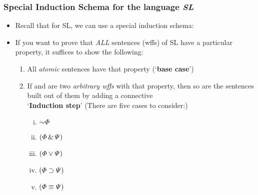 \begin{frame}
\frametitle{Special Induction Schema for the language {\it{SL}}}

\begin{itemize}[<+->]

\item Recall that for SL, we can use a special induction schema: 

\item If you want to prove that \emph{ALL} sentences (wffs) of SL have a particular property, it suffices to show the following:

\begin{enumerate}[<+->]

\item All \emph{atomic} sentences have that property (`\textbf{base case}')

\item If \metaA{} and \metaB{} are two \emph{arbitrary wffs} with that property, then so are the sentences built out of them by adding a connective \\ \hspace{4em} `\textbf{Induction step}' (There are five cases to consider:) 

\begin{enumerate}[(i)]
  \item $\enot \metaA{}$
  \item $(\varPhi{}\,\&\,\varPsi{})$ 
  \item $(\varPhi{}\vee\varPsi{})$ 
  \item $(\varPhi{}\supset\varPsi{})$
  \item $(\varPhi{}\equiv\varPsi{})$

\end{enumerate}


\end{enumerate}



\end{itemize} 
\end{frame}

